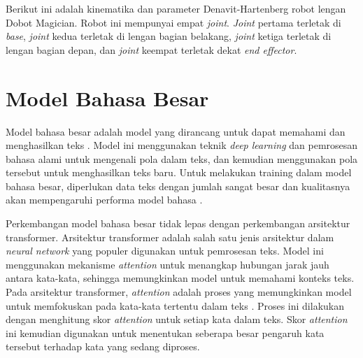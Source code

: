 Berikut ini adalah kinematika dan parameter Denavit-Hartenberg robot lengan Dobot Magician. Robot ini mempunyai empat \textit{joint}. \textit{Joint} pertama terletak di \textit{base}, \textit{joint} kedua terletak di lengan bagian belakang, \textit{joint} ketiga terletak di lengan bagian depan, dan \textit{joint} keempat terletak dekat \textit{end effector}.


\section{Model Bahasa Besar}

Model bahasa besar adalah model yang dirancang untuk dapat memahami dan menghasilkan teks \parencite{2023arXiv230706435}. Model ini menggunakan teknik \textit{deep learning} dan pemrosesan bahasa alami untuk mengenali pola dalam teks, dan kemudian menggunakan pola tersebut untuk menghasilkan teks baru. Untuk melakukan training dalam model bahasa besar, diperlukan data teks dengan jumlah sangat besar dan kualitasnya akan mempengaruhi performa model bahasa \parencite{liu2024understanding}.

Perkembangan model bahasa besar tidak lepas dengan perkembangan arsitektur transformer. Arsitektur transformer adalah salah satu jenis arsitektur dalam \textit{neural network} yang populer digunakan untuk pemrosesan teks. Model ini menggunakan mekanisme \textit{attention} untuk menangkap hubungan jarak jauh antara kata-kata, sehingga memungkinkan model untuk memahami konteks teks. Pada arsitektur transformer, \textit{attention} adalah proses yang memungkinkan model untuk memfokuskan pada kata-kata tertentu dalam teks \parencite{vaswani2023attention}. Proses ini dilakukan dengan menghitung skor \textit{attention} untuk setiap kata dalam teks. Skor \textit{attention} ini kemudian digunakan untuk menentukan seberapa besar pengaruh kata tersebut terhadap kata yang sedang diproses.

